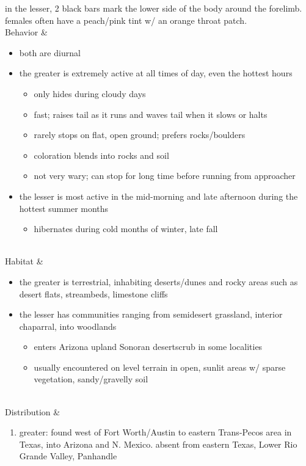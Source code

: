 \begin{center}
\begin{longtabu}
	in the lesser, 2 black bars mark the lower side of the body around the forelimb. females often have a peach/pink tint w/ an orange throat patch.
	\\
	\hline
	Behavior & 
	\begin{itemize}[noitemsep]
		\item both are diurnal
		\item the greater is extremely active at all times of day, even the hottest hours
			\begin{itemize}[noitemsep]
				\item only hides during cloudy days
				\item fast; raises tail as it runs and waves tail when it slows or halts
				\item rarely stops on flat, open ground; prefers rocks/boulders
				\item coloration blends into rocks and soil
				\item not very wary; can stop for long time before running from approacher
			\end{itemize}
	\item the lesser is most active in the mid-morning and late afternoon during the hottest summer months
		\begin{itemize}[noitemsep]
				\item hibernates during cold months of winter, late fall
		\end{itemize}
	\end{itemize}
	\\
	\hline
	Habitat & 
	\begin{itemize}[noitemsep]
		\item the greater is terrestrial, inhabiting deserts/dunes and rocky areas such as desert flats, streambeds, limestone cliffs
		\item the lesser has communities ranging from semidesert grassland, interior chaparral, into woodlands
			\begin{itemize}[noitemsep]
				\item enters Arizona upland Sonoran desertscrub in some localities
				\item usually encountered on level terrain in open, sunlit areas w/ sparse vegetation, sandy/gravelly soil
			\end{itemize}
	\end{itemize}
	\\
	\hline
	Distribution & 
	\begin{enumerate}
		\item greater: found west of Fort Worth/Austin to eastern Trans-Pecos area in Texas, into Arizona and N.  Mexico. absent from eastern Texas, Lower Rio Grande Valley, Panhandle

\end{enumerate}
\end{longtabu}
\end{center}
